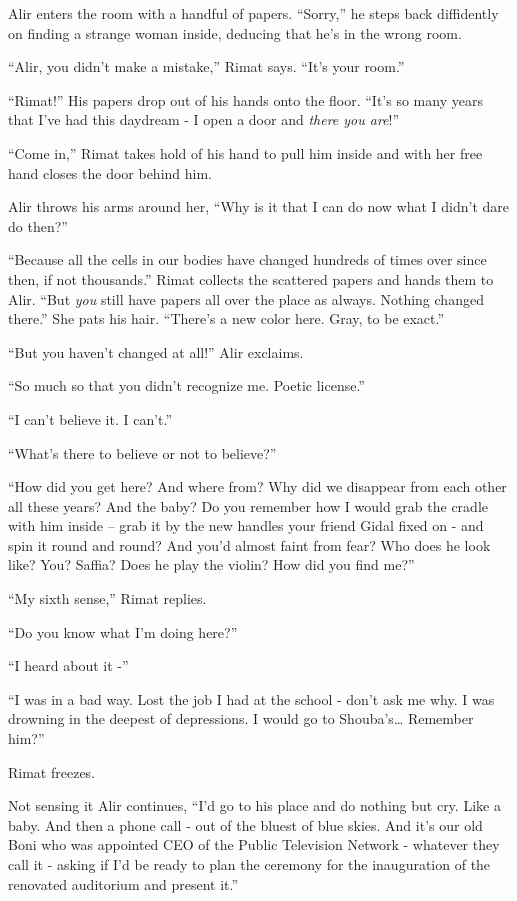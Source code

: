 \documentclass[twoside,11pt]{book}
\begin{document}
Alir enters the room with a handful of papers. ``Sorry,'' he steps back diffidently on finding
a strange woman inside, deducing that he's in the wrong room.

``Alir, you didn't make a mistake,'' Rimat says. ``It's your room.''


``Rimat!'' His papers drop out of his hands onto the floor.  ``It's so many years
that I've had this daydream - I open a door and \textit{there you are}!''

``Come in,'' Rimat takes hold of his hand to pull him inside and with her free hand closes the
door behind him.

Alir throws his arms around her, ``Why is it that I can do now what I didn't dare do then?''

``Because all the cells in our bodies have changed hundreds of times over since then, if not
thousands.'' Rimat collects the scattered papers and hands them to Alir. ``But \textit{you}
still have papers all over the place as always. Nothing changed there.'' She pats his hair.
``There's a new color here. Gray, to be exact.''

``But you haven't changed at all!'' Alir exclaims.

``So much so that you didn't recognize me. Poetic license.''

``I can't believe it. I can't.''

``What's there to believe or not to believe?''

``How did you get here? And where from? Why did we disappear from each other all these years? And the baby?
Do you remember how I would grab the cradle with him inside -- grab it by the new handles your friend Gidal
fixed on - and
spin it round and round? And you'd almost faint from fear? Who does he look like? You? Saffia? Does he play the violin?
How did you find me?''

``My sixth sense,'' Rimat replies.

``Do you know what I'm doing here?''

``I heard about it -''

``I was in a bad way. Lost the job I had at the school - don't ask me why. I was drowning in the deepest of
depressions. I would go to Shouba's{\ldots} Remember him?''

Rimat freezes.

Not sensing it Alir continues, ``I'd go to his place and do nothing but cry. Like a baby. And then a phone
call - out of the bluest of blue skies. And it's our old Boni who was appointed CEO of the Public Television Network -
whatever they call it - asking if I'd be ready to plan the ceremony for the inauguration of the renovated auditorium
and present it.''
\end{document}
